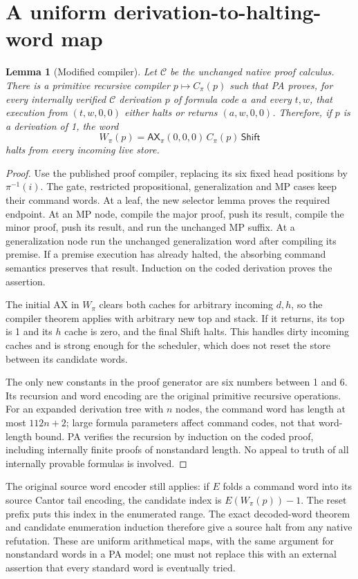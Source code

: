 \documentclass[10pt]{article}
\newtheorem{lemma}[theorem]{Lemma}
\newcommand{\Sh}{\mathsf{Shift}}
\newcommand{\Ax}{\mathsf{AX}}
\begin{document}
\section{A uniform derivation-to-halting-word map}

\begin{lemma}[Modified compiler]
Let $\mathcal C$ be the unchanged native proof calculus.  There is
a primitive recursive compiler $p\mapsto C_\pi(p)$ such that PA
proves, for every internally verified $\mathcal C$ derivation $p$
of formula code $a$ and every $t,w$, that execution from $(t,w,0,0)$
either halts or returns $(a,w,0,0)$.  Therefore, if $p$ is a
derivation of 1, the word
\[
 W_\pi(p)=\Ax_\pi(0,0,0)\,C_\pi(p)\,\Sh
\]
halts from \emph{every} incoming live store.
\end{lemma}
\begin{proof}
Use the published proof compiler, replacing its six fixed head
positions by $\pi^{-1}(i)$.  The gate, restricted propositional,
generalization and MP cases keep their command words.  At a leaf,
the new selector lemma proves the required endpoint.  At an MP
node, compile the major proof, push its result, compile the minor
proof, push its result, and run the unchanged MP suffix.  At a
generalization node run the unchanged generalization word after
compiling its premise.  If a premise execution has already halted,
the absorbing command semantics preserves that result.
Induction on the coded derivation proves the assertion.

The initial AX in $W_\pi$ clears both caches for arbitrary incoming
$d,h$, so the compiler theorem applies with arbitrary new top and
stack.  If it returns, its top is 1 and its $h$ cache is zero, and
the final Shift halts.  This handles dirty incoming caches and is
strong enough for the scheduler, which does not reset the store
between its candidate words.

The only new constants in the proof generator are six numbers
between 1 and 6.  Its recursion and word encoding are the original
primitive recursive operations.  For an expanded derivation tree
with $n$ nodes, the command word has length at most $112n+2$;
large formula parameters affect command codes, not that word-length
bound.  PA verifies the recursion by induction on the coded proof,
including internally finite proofs of nonstandard length.  No
appeal to truth of all internally provable formulas is involved.
\end{proof}

The original source word encoder still applies: if $E$ folds a
command word into its source Cantor tail encoding, the candidate
index is $E(W_\pi(p))-1$.  The reset prefix puts this index in the
enumerated range.  The exact decoded-word theorem and candidate
enumeration induction therefore give a source halt from any
native refutation.  These are uniform arithmetical maps, with the
same argument for nonstandard words in a PA model; one must not
replace this with an external assertion that every standard word
is eventually tried.
\end{document}
